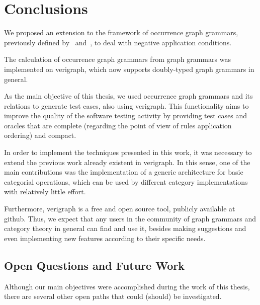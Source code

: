 \chapter{Conclusions}\label{ch:conclusions}


  We proposed an extension to the framework of occurrence graph grammars, previously defined by~\cite{Ribeiro1996} and~\cite{Corradini1996},  to deal with negative application conditions.

  The calculation of occurrence graph grammars from graph grammars was implemented on verigraph, which now supports doubly-typed graph grammars in general.

  As the main objective of this thesis, we used occurrence graph grammars and its relations to generate test cases, also using verigraph. This functionality aims to improve the quality of the software testing activity by providing test cases and oracles that are complete (regarding the point of view of rules application ordering) and compact.


  In order to implement the techniques presented in this work, it was necessary to extend the previous work already existent in verigraph. In this sense, one of the main contributions was the implementation of a generic architecture for basic categorial operations, which can be used by different category implementations with relatively little effort.

    Furthermore, verigraph is a free and open source tool, publicly available at github. Thus, we expect that any users in the community of graph grammars and category theory in general can find and use it, besides making suggestions and even implementing new features according to their specific needs.

\section{Open Questions and Future Work}

Although our main objectives were accomplished during the work of this thesis, there are several other open paths that could (should) be investigated. 


